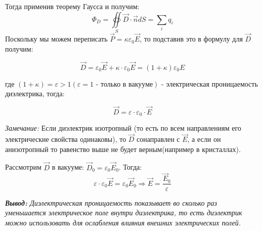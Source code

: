 \documentclass[../main.tex]{subfiles}
\begin{document}
Тогда применив теорему Гаусса и получим:
\[\Phi_D = \oiint\limits_S \vec D \cdot \vec n dS = \sum_{i} q_i\]
Поскольку мы можем переписать $\vec P = \kappa \varepsilon_0 \vec E$, то подставив это в формулу для $\vec D$ получим:

\[\vec D = \varepsilon_0 \vec E + \kappa \cdot \varepsilon_0 \vec E = (1+\kappa)\varepsilon_0 E\]
\begin{center}
    где $(1+\kappa) = \varepsilon > 1 (\varepsilon = 1 \text{ - только в вакууме})$ - электрическая проницаемость диэлектрика, тогда:
\end{center}

\[\vec D = \varepsilon \cdot \varepsilon_0 \cdot \vec E\]

\textit{Замечание:  }Если диэлектрик изотропный (то есть по всем направлениям его электрические свойства одинаковы), то $\vec D$ сонаправлен с $\vec E$, а если он анизотропный то равенство выше не будет верным(например в кристаллах).

\vspace{5px}

Рассмотрим $\vec D$ в вакууме: $\vec D_0 = \varepsilon_0 \vec E_0$. Тогда:
\[\varepsilon \cdot \varepsilon_0 \vec E = \varepsilon_0 \vec E_0 \Rightarrow \vec E = \frac{\vec E_0}{\varepsilon}\]


\textit{\textbf{Вывод:} Диэлектрическая проницаемость показывает во сколько раз уменьшается электрическое поле внутри диэлектрика,
    то есть диэлектрик можно использовать для ослабления влияния внешних электрических полей.}
\end{document}
